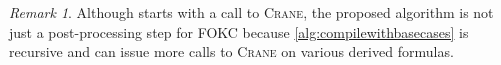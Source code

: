 \documentclass[letterpaper]{article} %
\theoremstyle{remark}
\newtheorem*{remark}{Remark}
\theoremstyle{definition}
\begin{document}
\begin{remark}
  Although \CompileWithBaseCases starts with a call to \textsc{Crane}, the
  proposed algorithm is not just a post-processing step for FOKC because
  \cref{alg:compilewithbasecases} is recursive and can issue more calls to
  \textsc{Crane} on various derived formulas.
\end{remark}



\end{document}
